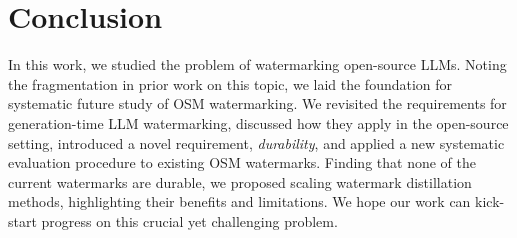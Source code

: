 \section{Conclusion}
In this work, we studied the problem of watermarking open-source LLMs.  
Noting the fragmentation in prior work on this topic, we laid the foundation for systematic future study of OSM watermarking.  
We revisited the requirements for generation-time LLM watermarking, discussed how they apply in the open-source setting, introduced a novel requirement, \emph{durability}, and applied a new systematic evaluation procedure to existing OSM watermarks.  
Finding that none of the current watermarks are durable, we proposed scaling watermark distillation methods, highlighting their benefits and limitations.  
We hope our work can kick-start progress on this crucial yet challenging problem.  
